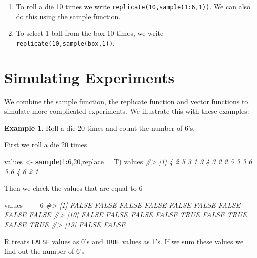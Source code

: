 \documentclass[
]{book}
\newenvironment{Shaded}{\begin{snugshade}}{\end{snugshade}}
\newcommand{\AttributeTok}[1]{\textcolor[rgb]{0.13,0.29,0.53}{#1}}
\newcommand{\CommentTok}[1]{\textcolor[rgb]{0.56,0.35,0.01}{\textit{#1}}}
\newcommand{\DecValTok}[1]{\textcolor[rgb]{0.00,0.00,0.81}{#1}}
\newcommand{\FunctionTok}[1]{\textcolor[rgb]{0.13,0.29,0.53}{\textbf{#1}}}
\newcommand{\NormalTok}[1]{#1}
\newcommand{\OtherTok}[1]{\textcolor[rgb]{0.56,0.35,0.01}{#1}}
\newcommand{\SpecialCharTok}[1]{\textcolor[rgb]{0.81,0.36,0.00}{\textbf{#1}}}
\providecommand{\tightlist}{%
  \setlength{\itemsep}{0pt}\setlength{\parskip}{0pt}}
\theoremstyle{definition}
\theoremstyle{definition}
\newtheorem{example}{Example}[chapter]
\theoremstyle{definition}
\theoremstyle{definition}
\theoremstyle{remark}
\begin{document}
\begin{enumerate}
\def\labelenumi{\arabic{enumi}.}
\tightlist
\item
  To roll a die 10 times we write \texttt{replicate(10,sample(1:6,1))}. We can also do this using the sample function.
\item
  To select 1 ball from the box 10 times, we write \texttt{replicate(10,sample(box,1))}.
\end{enumerate}

\hypertarget{simulating-experiments}{%
\section{Simulating Experiments}\label{simulating-experiments}}

We combine the sample function, the replicate function and vector functions to simulate more complicated experiments. We illustrate this with these examples:

\begin{example}
Roll a die 20 times and count the number of 6's.
\end{example}

First we roll a die 20 times

\begin{Shaded}
\begin{Highlighting}[]
\NormalTok{values }\OtherTok{\textless{}{-}} \FunctionTok{sample}\NormalTok{(}\DecValTok{1}\SpecialCharTok{:}\DecValTok{6}\NormalTok{,}\DecValTok{20}\NormalTok{,}\AttributeTok{replace =}\NormalTok{ T)}
\NormalTok{values}
\CommentTok{\#\textgreater{}  [1] 4 2 5 3 1 3 4 3 2 2 5 3 3 6 3 6 4 6 2 1}
\end{Highlighting}
\end{Shaded}

Then we check the values that are equal to 6

\begin{Shaded}
\begin{Highlighting}[]
\NormalTok{values }\SpecialCharTok{==} \DecValTok{6}
\CommentTok{\#\textgreater{}  [1] FALSE FALSE FALSE FALSE FALSE FALSE FALSE FALSE FALSE}
\CommentTok{\#\textgreater{} [10] FALSE FALSE FALSE FALSE  TRUE FALSE  TRUE FALSE  TRUE}
\CommentTok{\#\textgreater{} [19] FALSE FALSE}
\end{Highlighting}
\end{Shaded}

R treats \texttt{FALSE} values as 0's and \texttt{TRUE} values as 1's. If we sum these values we find out the number of 6's
\end{document}
